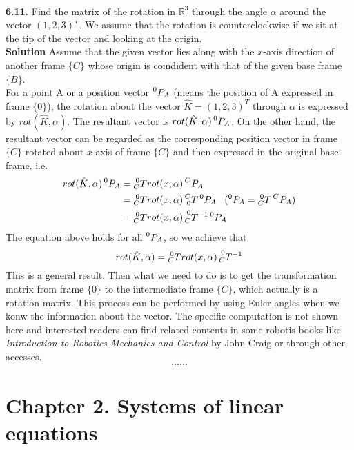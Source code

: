 \documentclass[11pt, a4paper]{article}
\begin{document}
\\
\textbf{6.11.} Find the matrix of the rotation in $\mathbb{R}^3$ through the angle $\alpha$ around the vector $(1,2,3)^T$. We assume that the rotation is counterclockwise if we sit at the tip of the vector and looking at the origin.
\\ \textbf{Solution} Assume that the given vector lies along with the $x$-axis direction of another frame $\{C\}$ whose origin is coindident with that of the given base frame $\{B\}$.\\
For a point A or a position vector $\prescript{0}{}{P_A}$ (means the position of A expressed in frame $\{0\}$), the rotation about the vector $\hat{K}=(1,2,3)^T$ through $\alpha$ is expressed by $rot(\hat{K},\alpha)$. The resultant vector is $rot(\hat{K},\alpha)\prescript{0}{}{P_A}$. On the other hand, the resultant vector can be regarded as the corresponding position vector in frame $\{C\}$ rotated about $x$-axis of frame $\{C\}$ and then expressed in the original base frame. i.e.
\begin{equation*}
	\begin{split}
	rot(\hat{K},\alpha)\prescript{0}{}{P_A} &= \prescript{0}{C}{T}rot(x,\alpha)\prescript{C}{}{P_A} \\
	                                        &= \prescript{0}{C}{T}rot(x,\alpha)\prescript{C}{0}{T}\prescript{0}{}{P_A} \;\;\;(\prescript{0}{} {P_A}=\prescript{0}{C}{T}\prescript{C}{}{P_A})\\
	                                        &= \prescript{0}{C}{T}rot(x,\alpha)\prescript{0}{C}{T^{-1}}\prescript{0}{}{P_A} 
	\end{split}
\end{equation*}
The equation above holds for all $\prescript{0}{}{P_A}$, so we achieve that
\begin{equation*}
	rot(\hat{K},\alpha) = \prescript{0}{C}{T}rot(x,\alpha)\prescript{0}{C}{T^{-1}}
\end{equation*}
This is a general result. Then what we need to do is to get the transformation matrix from frame $\{0\}$ to the intermediate frame $\{C\}$, which actually is a rotation matrix. This process can be performed by using Euler angles when we konw the information about the vector. The specific computation is not shown here and interested readers can find related contents in some robotis books like \emph{Introduction to Robotics Mechanics and Control} by John Craig or through other accesses.
$$......$$
\section*{Chapter 2. Systems of linear equations}
\end{document}
